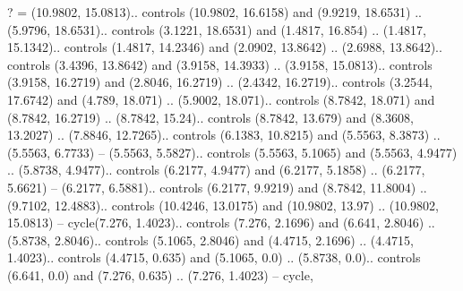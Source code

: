 ? = {(10.9802, 15.0813).. controls (10.9802, 16.6158) and (9.9219, 18.6531) .. (5.9796, 18.6531).. controls (3.1221, 18.6531) and (1.4817, 16.854) .. (1.4817, 15.1342).. controls (1.4817, 14.2346) and (2.0902, 13.8642) .. (2.6988, 13.8642).. controls (3.4396, 13.8642) and (3.9158, 14.3933) .. (3.9158, 15.0813).. controls (3.9158, 16.2719) and (2.8046, 16.2719) .. (2.4342, 16.2719).. controls (3.2544, 17.6742) and (4.789, 18.071) .. (5.9002, 18.071).. controls (8.7842, 18.071) and (8.7842, 16.2719) .. (8.7842, 15.24).. controls (8.7842, 13.679) and (8.3608, 13.2027) .. (7.8846, 12.7265).. controls (6.1383, 10.8215) and (5.5563, 8.3873) .. (5.5563, 6.7733) -- (5.5563, 5.5827).. controls (5.5563, 5.1065) and (5.5563, 4.9477) .. (5.8738, 4.9477).. controls (6.2177, 4.9477) and (6.2177, 5.1858) .. (6.2177, 5.6621) -- (6.2177, 6.5881).. controls (6.2177, 9.9219) and (8.7842, 11.8004) .. (9.7102, 12.4883).. controls (10.4246, 13.0175) and (10.9802, 13.97) .. (10.9802, 15.0813) -- cycle(7.276, 1.4023).. controls (7.276, 2.1696) and (6.641, 2.8046) .. (5.8738, 2.8046).. controls (5.1065, 2.8046) and (4.4715, 2.1696) .. (4.4715, 1.4023).. controls (4.4715, 0.635) and (5.1065, 0.0) .. (5.8738, 0.0).. controls (6.641, 0.0) and (7.276, 0.635) .. (7.276, 1.4023) -- cycle},

